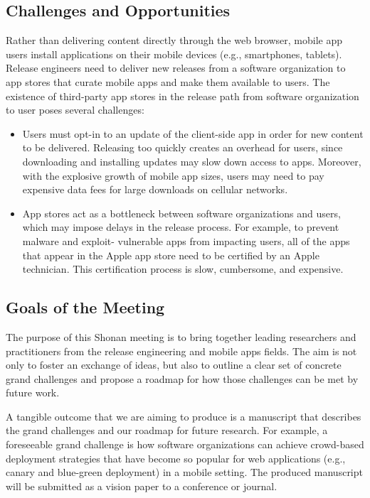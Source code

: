 \documentclass[a4paper]{article}
\begin{document}
\subsection{Challenges and Opportunities}

Rather than delivering content directly through the web browser, mobile app users install applications on their mobile devices (e.g., smartphones, tablets).
Release engineers need to deliver new releases from a software organization to app stores that curate mobile apps and make them available to users.
The existence of third-party app stores in the release path from software organization to user poses several challenges:

\begin{itemize}
\item Users must opt-in to an update of the client-side app in order for new content to be delivered. Releasing too quickly creates an overhead for users, since downloading and installing updates may slow down access to apps. Moreover, with the explosive growth of mobile app sizes, users may need to pay expensive data fees for large downloads on cellular networks.
\item App stores act as a bottleneck between software organizations and users, which may impose delays in the release process. For example, to prevent malware and exploit- vulnerable apps from impacting users, all of the apps that appear in the Apple app store need to be certified by an Apple technician. This certification process is slow, cumbersome, and expensive.
\end{itemize}

\subsection{Goals of the Meeting}

The purpose of this Shonan meeting is to bring together leading researchers and practitioners from the release engineering and mobile apps fields. The aim is not only to foster an exchange of ideas, but also to outline a clear set of concrete grand challenges and propose a roadmap for how those challenges can be met by future work.

A tangible outcome that we are aiming to produce is a manuscript that describes the grand challenges and our roadmap for future research.
For example, a foreseeable grand challenge is how software organizations can achieve crowd-based deployment strategies that have become so popular for web applications (e.g., canary and blue-green deployment) in a mobile setting.
The produced manuscript will be submitted as a vision paper to a conference or journal.
\end{document}
